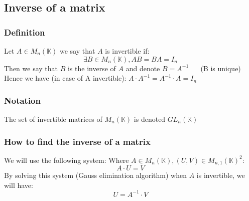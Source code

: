 \documentclass[notitlepage]{math}
\begin{document}
\subsection{Inverse of a matrix}
\subsubsection{Definition}
Let $A \in M_{n}(\mathbb{K})$ we say that $A$ is invertible if:
\[  \exists B \in M_{n}(\mathbb{K}), AB = BA = I_n \]
Then we say that $B$ is the inverse of $A$ and denote $B = A^{-1}$ $\quad$ (B is unique)
Hence we have (in case of A invertible): $A \cdot A^{-1} = A^{-1} \cdot A = I_n$
\subsubsection{Notation}
The set of invertible matrices of $M_{n}(\mathbb{K})$ is denoted $GL_n(\mathbb{K})$
\subsubsection{How to find the inverse of a matrix}
We will use the following system:
Where $A \in M_{n}(\mathbb{K}), (U,V) \in M_{n,1}(\mathbb{K})^2$:
\[A \cdot U = V  \]
By solving this system (Gauss elimination algorithm) when $A$ is invertible, we will have:
\[ U = A^{-1} \cdot V \]
\end{document}
